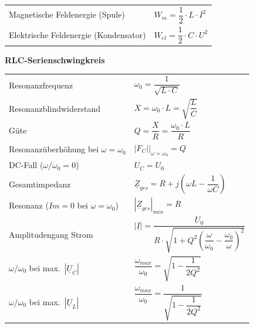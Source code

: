 \documentclass[a4paper,12pt]{scrartcl}
\begin{document}
\begin{tabular}{@{} l l @{}}
\hspace*{20mm} Magnetische Feldenergie (Spule) & $W_m = \dfrac{1}{2}\cdot L\cdot I^2$ \\
\hspace*{20mm} Elektrische Feldenergie (Kondensator) & $W_{el} = \dfrac{1}{2}\cdot C\cdot U^2$ \\
\end{tabular}

\vspace*{3mm}
\noindent\textbf{RLC-Serienschwingkreis}

\begin{tabular}{@{} l l @{}}
\hspace*{20mm} Resonanzfrequenz & $\omega_0 = \dfrac{1}{\sqrt{L\cdot C}}$ \\
\hspace*{20mm} Resonanzblindwiderstand & $X = \omega_0\cdot L = \sqrt{\dfrac{L}{C}}$ \\
\hspace*{20mm} Güte & $Q = \dfrac{X}{R} = \dfrac{\omega_0\cdot L}{R}$ \\
\hspace*{20mm} Resonanzüberhöhung bei $\omega = \omega_0$ & $\left.|F_C|\right|_{\omega=\omega_0} = Q$ \\
\hspace*{20mm} DC-Fall ($\omega/\omega_0 = 0$) & $U_C = U_0$ \\
\hspace*{20mm} Gesamtimpedanz & $\underline{Z}_{ges} = R + j\!\left(\omega L - \dfrac{1}{\omega C}\right)$ \\
\hspace*{20mm} Resonanz ($Im = 0$ bei $\omega = \omega_0$) & $|\underline{Z}_{ges}|_{min} = R$ \\
\hspace*{20mm} Amplitudengang Strom & $|\underline{I}| = \dfrac{U_0}{R\cdot\sqrt{1 + Q^2\!\left(\dfrac{\omega}{\omega_0} - \dfrac{\omega_0}{\omega}\right)^2}}$ \\[3mm]
\hspace*{20mm} $\omega/\omega_0$ bei max.\ $|\underline{U}_C|$ & $\dfrac{\omega_{max}}{\omega_0} = \sqrt{1 - \dfrac{1}{2Q^2}}$ \\
\hspace*{20mm} $\omega/\omega_0$ bei max.\ $|\underline{U}_L|$ & $\dfrac{\omega_{max}}{\omega_0} = \dfrac{1}{\sqrt{1 - \dfrac{1}{2Q^2}}}$ \\[3mm]
\end{tabular}
\end{document}
